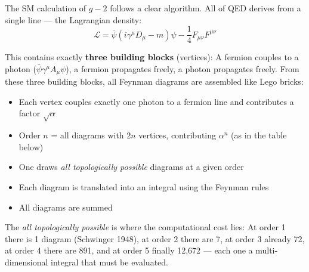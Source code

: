The SM calculation of $g-2$ follows a clear algorithm. All of QED derives from a single line --- the Lagrangian density:
\begin{equation}
	\mathcal{L} = \bar{\psi}(i\gamma^\mu D_\mu - m)\psi - \frac{1}{4}F_{\mu\nu}F^{\mu\nu}
\end{equation}

This contains exactly \textbf{three building blocks} (vertices): A fermion couples to a photon ($\bar{\psi}\gamma^\mu A_\mu \psi$), a fermion propagates freely, a photon propagates freely. From these three building blocks, all Feynman diagrams are assembled like Lego bricks:

\begin{itemize}
	\item Each vertex couples exactly one photon to a fermion line and contributes a factor $\sqrt{\alpha}$
	\item Order $n$ = all diagrams with $2n$ vertices, contributing $\alpha^{n}$ (as in the table below)
	\item One draws \textit{all topologically possible} diagrams at a given order
	\item Each diagram is translated into an integral using the Feynman rules
	\item All diagrams are summed
\end{itemize}

The \textit{all topologically possible} is where the computational cost lies: At order 1 there is 1 diagram (Schwinger 1948), at order 2 there are 7, at order 3 already 72, at order 4 there are 891, and at order 5 finally 12,672 --- each one a multi-dimensional integral that must be evaluated.

\begin{table}[h]
	\centering
	\caption{Growth of Feynman diagrams by order in QED}
	\label{tab:diagrams}
\end{table}

